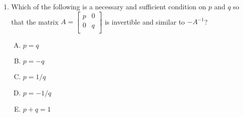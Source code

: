 \documentclass[10pt]{amsart}
\begin{document}
\begin{enumerate}
  \begin{enumerate}[(A)]
  \item $p = q$
  \item $p = -q$
  \item $p = 1/q$
  \item $p = -1/q$
  \item $p + q = 1$
  \end{enumerate}

  {\em Answer}: Option (B)

  {\em Explanation}: We have:

  $$-A = \left[\begin{matrix} -p & 0 \\ 0 & -q \\\end{matrix}\right]$$

  Now, for $A$ to be similar to $-A$, we have one of these two conditions:

  $$-A = A \text{ or } -A = \left[\begin{matrix} q & 0 \\ 0 & p \\\end{matrix}\right]$$

  The first case ($-A = A$) gives us that $p = q = 0$, so that $A$ is
  the zero matrix. The second case gives us that $-p = q$ and $-q =
  p$. Both of these are equivalent to $p = -q$. We now notice that the
  first case $p = q = 0$ is subsumed within the second case, so that
  $p = -q$ describes the necessary and sufficient condition.

  {\em Performance review}: 20 out of 25 got this. 2 each chose (A)
  and (D), 1 chose (C).

\item Which of the following is a necessary and sufficient condition
  on $p$ and $q$ so that the matrix $A = \left[\begin{matrix} p & 0
      \\ 0 & q \\\end{matrix}\right]$ is invertible and similar to
  $-A^{-1}$?

  \begin{enumerate}[(A)]
  \item $p = q$
  \item $p = -q$
  \item $p = 1/q$
  \item $p = -1/q$
  \item $p + q = 1$
  \end{enumerate}


\end{enumerate}
\end{document}
